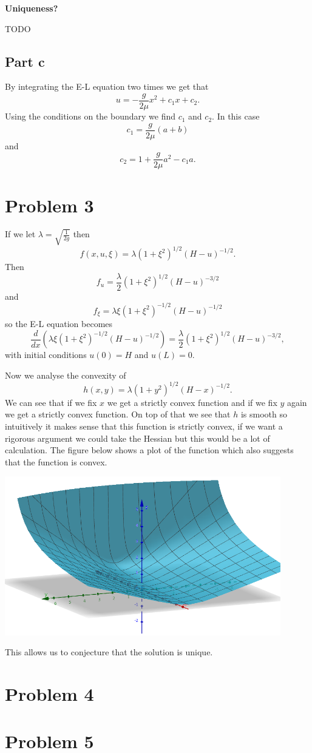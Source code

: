 \documentclass{article}
\begin{document}
\textbf{Uniqueness?}

TODO
\subsection{Part c}
By integrating the E-L equation two times we get that
\[
	u=-\frac{g}{2\mu} x^2 +c_1x+c_2.
\]
Using the conditions on the boundary we find $c_1$ and $c_2$. In this case
\[
	c_1=\frac{g}{2\mu}(a+b)
\]
and
\[
	c_2=1+\frac{g}{2\mu}a^2-c_1a.
\]
\section{Problem 3}
If we let $\lambda=\sqrt{\frac{1}{2g}}$ then
\[
	f(x,u,\xi)=\lambda(1+\xi^2)^{1/2}(H-u)^{-1/2}.
\]
Then
\[
	f_u=\frac{\lambda}{2}(1+\xi^2)^{1/2}(H-u)^{-3/2}
\]
and
\[
	f_\xi=\lambda\xi(1+\xi^2)^{-1/2}(H-u)^{-1/2}
\]
so the E-L equation becomes
\[
	\frac{d}{dx}(\lambda\xi(1+\xi^2)^{-1/2}(H-u)^{-1/2})
	=\frac{\lambda}{2}(1+\xi^2)^{1/2}(H-u)^{-3/2},
\]
with initial conditions $u(0)=H$ and $u(L)=0$.

Now we analyse the convexity of
\[
	h(x,y)=\lambda (1+y^2)^{1/2}(H-x)^{-1/2}.
\]
We can see that if we fix $x$ we get a strictly convex function and if we fix
$y$ again we get a strictly convex function. On top of that we see
that $h$ is smooth so intuitively it makes sense that this function
is strictly convex, if we want a rigorous argument we could take the Hessian
but this would be a lot of calculation. The figure below shows a plot of the
function which also suggests that the function is convex.

\includegraphics[width=0.9\textwidth]{convex.png}

This allows us to conjecture that the solution is unique.
\section{Problem 4}
\section{Problem 5}
\end{document}
